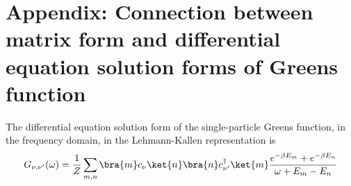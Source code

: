 
\section{Appendix: Connection between matrix form and differential equation solution forms of Greens function}
The differential equation solution form of the single-particle Greens function, in the frequency domain, in the Lehmann-Kallen representation is
\begin{equation}\begin{aligned}
	G_{\nu,\nu^\prime}(\omega) = \frac{1}{Z}\sum_{m,n}\bra{m}c_{\nu}\ket{n}\bra{n}c^\dagger_{\nu^\prime}\ket{m}\frac{e^{-\beta E_m} + e^{-\beta E_n}}{\omega + E_m - E_n}
\end{aligned}\end{equation}


